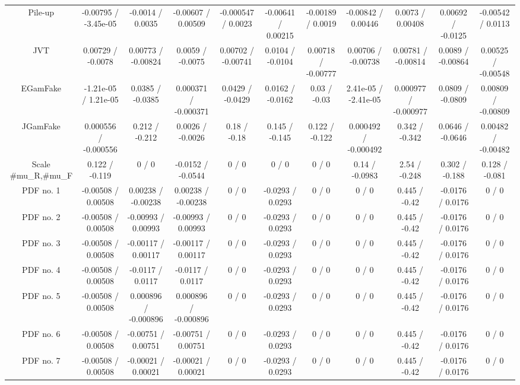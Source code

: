 \begin{table}[htbp]
\begin{center}
\begin{tabular}{|c|c|c|c|c|c|c|c|c|c|c|}
  Pile-up & -0.00795 / -3.45e-05 & -0.0014 / 0.0035 & -0.00607 / 0.00509 & -0.000547 / 0.0023 & -0.00641 / 0.00215 & -0.00189 / 0.0019 & -0.00842 / 0.00446 & 0.0073 / 0.00408 & 0.00692 / -0.0125 & -0.00542 / 0.0113 \\ 
  JVT & 0.00729 / -0.0078 & 0.00773 / -0.00824 & 0.0059 / -0.0075 & 0.00702 / -0.00741 & 0.0104 / -0.0104 & 0.00718 / -0.00777 & 0.00706 / -0.00738 & 0.00781 / -0.00814 & 0.0089 / -0.00864 & 0.00525 / -0.00548 \\ 
  EGamFake & -1.21e-05 / 1.21e-05 & 0.0385 / -0.0385 & 0.000371 / -0.000371 & 0.0429 / -0.0429 & 0.0162 / -0.0162 & 0.03 / -0.03 & 2.41e-05 / -2.41e-05 & 0.000977 / -0.000977 & 0.0809 / -0.0809 & 0.00809 / -0.00809 \\ 
  JGamFake & 0.000556 / -0.000556 & 0.212 / -0.212 & 0.0026 / -0.0026 & 0.18 / -0.18 & 0.145 / -0.145 & 0.122 / -0.122 & 0.000492 / -0.000492 & 0.342 / -0.342 & 0.0646 / -0.0646 & 0.00482 / -0.00482 \\ 
  Scale #mu_{R},#mu_{F} & 0.122 / -0.119 & 0 / 0 & -0.0152 / -0.0544 & 0 / 0 & 0 / 0 & 0 / 0 & 0.14 / -0.0983 & 2.54 / -0.248 & 0.302 / -0.188 & 0.128 / -0.081 \\ 
  PDF no. 1 & -0.00508 / 0.00508 & 0.00238 / -0.00238 & 0.00238 / -0.00238 & 0 / 0 & -0.0293 / 0.0293 & 0 / 0 & 0 / 0 & 0.445 / -0.42 & -0.0176 / 0.0176 & 0 / 0 \\ 
  PDF no. 2 & -0.00508 / 0.00508 & -0.00993 / 0.00993 & -0.00993 / 0.00993 & 0 / 0 & -0.0293 / 0.0293 & 0 / 0 & 0 / 0 & 0.445 / -0.42 & -0.0176 / 0.0176 & 0 / 0 \\ 
  PDF no. 3 & -0.00508 / 0.00508 & -0.00117 / 0.00117 & -0.00117 / 0.00117 & 0 / 0 & -0.0293 / 0.0293 & 0 / 0 & 0 / 0 & 0.445 / -0.42 & -0.0176 / 0.0176 & 0 / 0 \\ 
  PDF no. 4 & -0.00508 / 0.00508 & -0.0117 / 0.0117 & -0.0117 / 0.0117 & 0 / 0 & -0.0293 / 0.0293 & 0 / 0 & 0 / 0 & 0.445 / -0.42 & -0.0176 / 0.0176 & 0 / 0 \\ 
  PDF no. 5 & -0.00508 / 0.00508 & 0.000896 / -0.000896 & 0.000896 / -0.000896 & 0 / 0 & -0.0293 / 0.0293 & 0 / 0 & 0 / 0 & 0.445 / -0.42 & -0.0176 / 0.0176 & 0 / 0 \\ 
  PDF no. 6 & -0.00508 / 0.00508 & -0.00751 / 0.00751 & -0.00751 / 0.00751 & 0 / 0 & -0.0293 / 0.0293 & 0 / 0 & 0 / 0 & 0.445 / -0.42 & -0.0176 / 0.0176 & 0 / 0 \\ 
  PDF no. 7 & -0.00508 / 0.00508 & -0.00021 / 0.00021 & -0.00021 / 0.00021 & 0 / 0 & -0.0293 / 0.0293 & 0 / 0 & 0 / 0 & 0.445 / -0.42 & -0.0176 / 0.0176 & 0 / 0 \\ 

\end{tabular}
\end{center}
\end{table}
